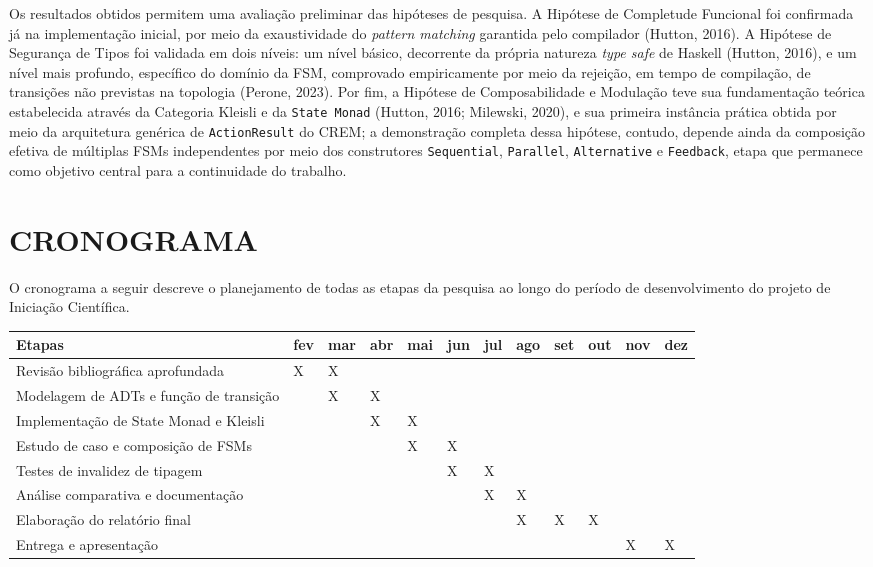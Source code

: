 \documentclass[12pt,a4paper]{article}
\begin{document}
Os resultados obtidos permitem uma avaliação preliminar das hipóteses de pesquisa. A Hipótese de Completude Funcional foi confirmada já na implementação inicial, por meio da exaustividade do \textit{pattern matching} garantida pelo compilador (Hutton, 2016). A Hipótese de Segurança de Tipos foi validada em dois níveis: um nível básico, decorrente da própria natureza \textit{type safe} de Haskell (Hutton, 2016), e um nível mais profundo, específico do domínio da FSM, comprovado empiricamente por meio da rejeição, em tempo de compilação, de transições não previstas na topologia (Perone, 2023). Por fim, a Hipótese de Composabilidade e Modulação teve sua fundamentação teórica estabelecida através da Categoria Kleisli e da \texttt{State Monad} (Hutton, 2016; Milewski, 2020), e sua primeira instância prática obtida por meio da arquitetura genérica de \texttt{ActionResult} do CREM; a demonstração completa dessa hipótese, contudo, depende ainda da composição efetiva de múltiplas FSMs independentes por meio dos construtores \texttt{Sequential}, \texttt{Parallel}, \texttt{Alternative} e \texttt{Feedback}, etapa que permanece como objetivo central para a continuidade do trabalho.

\section{CRONOGRAMA}

O cronograma a seguir descreve o planejamento de todas as etapas da pesquisa ao longo do período de desenvolvimento do projeto de Iniciação Científica.

\begin{table}[h]
\centering
\small
\begin{tabular}{|p{4.0cm}|p{0.6cm}|p{0.6cm}|p{0.6cm}|p{0.6cm}|p{0.6cm}|p{0.6cm}|p{0.6cm}|p{0.6cm}|p{0.6cm}|p{0.6cm}|p{0.6cm}|}
\hline
\textbf{Etapas} & \textbf{fev} & \textbf{mar} & \textbf{abr} & \textbf{mai} & \textbf{jun} & \textbf{jul} & \textbf{ago} & \textbf{set} & \textbf{out} & \textbf{nov} & \textbf{dez} \\
\hline
Revisão bibliográfica aprofundada & X & X & & & & & & & & & \\
\hline
Modelagem de ADTs e função de transição & & X & X & & & & & & & & \\
\hline
Implementação de State Monad e Kleisli & & & X & X & & & & & & & \\
\hline
Estudo de caso e composição de FSMs & & & & X & X & & & & & & \\
\hline
Testes de invalidez de tipagem & & & & & X & X & & & & & \\
\hline
Análise comparativa e documentação & & & & & & X & X & & & & \\
\hline
Elaboração do relatório final & & & & & & & X & X & X & & \\
\hline
Entrega e apresentação & & & & & & & & & & X & X \\
\hline
\end{tabular}
\end{table}
\end{document}
